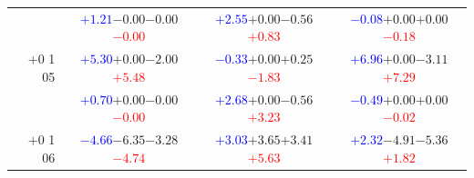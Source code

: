 \documentclass[compress]{beamer}
\begin{document}
\begin{frame}
\begin{tabular}{r | c | c | c}
          & \textcolor{blue}{$+1.21$}\hspace{0.1 cm}$-0.00$\hspace{0.1 cm}$-0.00$\hspace{0.1 cm}\textcolor{red}{$-0.00$} & \textcolor{blue}{$+2.55$}\hspace{0.1 cm}$+0.00$\hspace{0.1 cm}$-0.56$\hspace{0.1 cm}\textcolor{red}{$+0.83$} & \textcolor{blue}{$-0.08$}\hspace{0.1 cm}$+0.00$\hspace{0.1 cm}$+0.00$\hspace{0.1 cm}\textcolor{red}{$-0.18$} \\
$+$0 1 05 & \textcolor{blue}{$+5.30$}\hspace{0.1 cm}$+0.00$\hspace{0.1 cm}$-2.00$\hspace{0.1 cm}\textcolor{red}{$+5.48$} & \textcolor{blue}{$-0.33$}\hspace{0.1 cm}$+0.00$\hspace{0.1 cm}$+0.25$\hspace{0.1 cm}\textcolor{red}{$-1.83$} & \textcolor{blue}{$+6.96$}\hspace{0.1 cm}$+0.00$\hspace{0.1 cm}$-3.11$\hspace{0.1 cm}\textcolor{red}{$+7.29$} \\
          & \textcolor{blue}{$+0.70$}\hspace{0.1 cm}$+0.00$\hspace{0.1 cm}$-0.00$\hspace{0.1 cm}\textcolor{red}{$-0.00$} & \textcolor{blue}{$+2.68$}\hspace{0.1 cm}$+0.00$\hspace{0.1 cm}$-0.56$\hspace{0.1 cm}\textcolor{red}{$+3.23$} & \textcolor{blue}{$-0.49$}\hspace{0.1 cm}$+0.00$\hspace{0.1 cm}$+0.00$\hspace{0.1 cm}\textcolor{red}{$-0.02$} \\
$+$0 1 06 & \textcolor{blue}{$-4.66$}\hspace{0.1 cm}$-6.35$\hspace{0.1 cm}$-3.28$\hspace{0.1 cm}\textcolor{red}{$-4.74$} & \textcolor{blue}{$+3.03$}\hspace{0.1 cm}$+3.65$\hspace{0.1 cm}$+3.41$\hspace{0.1 cm}\textcolor{red}{$+5.63$} & \textcolor{blue}{$+2.32$}\hspace{0.1 cm}$-4.91$\hspace{0.1 cm}$-5.36$\hspace{0.1 cm}\textcolor{red}{$+1.82$} \\

\end{tabular}
\end{frame}
\end{document}
